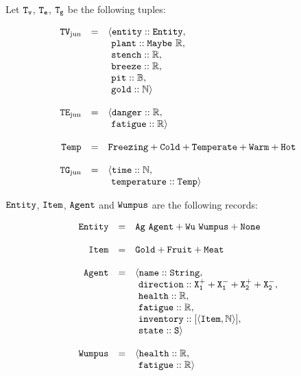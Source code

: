 \begin{definition}[\wjun]
\label{def:wjun}
Let $\mathtt{T_v}$, $\mathtt{T_e}$, $\mathtt{T_g}$ be the following tuples:

$$
	\begin{array}{r c l}
		\type{TV_{\mathrm{jun}}} & = & \langle \field{entity} :: \type{Entity},\\
		           &   & 	   \ \field{plant} :: \type{Maybe\ \R},\\
		           &   &     \ \field{stench} :: \R,\\
		           &   &     \ \field{breeze} :: \R,\\
		           &   &	   \ \field{pit}    :: \B,\\
		           &   &	   \ \field{gold}   :: \N \rangle 
		\\
		\\
		\type{TE_{\mathrm{jun}}} & = & \langle \field{danger} :: \R,\\
				   &   &       \ \field{fatigue} :: \R \rangle
		\\
		\\
		\type{Temp} & = & \type{Freezing} + \type{Cold} + \type{Temperate} + \type{Warm} + \type{Hot}\\
		\\
		\type{TG_{\mathrm{jun}}} & = & \langle \field{time} :: \N,\\
				   &   &       \ \field{temperature} :: \type{Temp} \rangle
	\end{array}
$$

$\mathtt{Entity}$, $\mathtt{Item}$, $\mathtt{Agent}$ and $\mathtt{Wumpus}$ are the following records:

$$
	\begin{array}{r c l}
		\mathtt{Entity} & = & \mathtt{Ag\ Agent + Wu\ Wumpus + None}\\
		\\
		\mathtt{Item} & = & \mathtt{Gold + Fruit + Meat}\\
		\\
		\mathtt{Agent} & = & \langle \mathtt{name} :: \mathtt{String},\\ 
					 &   & \ \mathtt{direction} :: \mathtt{X_1^+ + X_1^- + X_2^+ + X_2^-},\\
					 &   & \ \mathtt{health} :: \mathbb{R},\\
					 &   & \ \mathtt{fatigue} :: \mathbb{R},\\
					 &   & \ \mathtt{inventory} :: [\mathtt{\langle Item, \mathbb{N} \rangle}],\\
					 &   & \ \mathtt{state} :: \mathtt{S} \rangle
		\\
		\\
		\mathtt{Wumpus} & = & \langle \mathtt{health} :: \mathbb{R},\\
					  &   & \ \mathtt{fatigue} :: \mathbb{R}\rangle
	\end{array}
$$


\end{definition}
